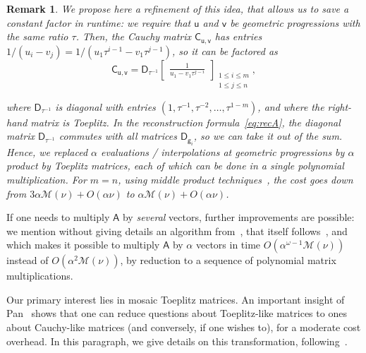 \documentclass[sigconf]{acmart}
\newcommand{\vg}{\ensuremath{\mathsf{g}}}
\newcommand{\vu}{\ensuremath{\mathsf{u}}}
\newcommand{\vv}{\ensuremath{\mathsf{v}}}
\newcommand{\mA}{\ensuremath{\mathsf{A}}}
\newcommand{\mC}{\ensuremath{\mathsf{C}}}
\newcommand{\mD}{\ensuremath{\mathsf{D}}}
\newcommand{\M}{\ensuremath{\mathscr{M}}}
\newcommand{\mx}{\ensuremath{\nu}}
\theoremstyle{acmdefinition}
\newtheorem{remark}[theorem]{Remark}
\begin{document}
\vspace{-2mm}

\begin{remark}\label{rmk:factor3}
We propose here a refinement of this idea, that allows us to
save a constant factor in runtime: we require that $\vu$ and $\vv$ be
geometric progressions with {\em the same ratio} $\tau$. Then, the
Cauchy matrix $\mC_{\vu,\vv}$ has entries $1/(u_i -
v_j) = 1/(u_1 \tau^{i-1} - v_1 \tau^{j-1})$, so it can be factored as
\vspace{-3px}
$$
\mC_{\vu,\vv}=\mD_{\tau^{-1}}
\begin{bmatrix}
\frac{1}{u_1 - v_1 \tau^{j-i}}
\end{bmatrix}_{\substack{1 \leq i \leq m\\1 \leq j \leq n}},
$$

\vspace{-3px}
\noindent where $\mD_{\tau^{-1}}$ is diagonal with entries
$(1,\tau^{-1},\tau^{-2},\dots,\tau^{1-m})$, and where the right-hand
matrix is Toeplitz. In the reconstruction formula~\eqref{eq:recA}, the
diagonal matrix $\mD_{\tau^{-1}}$ commutes with all matrices
$\mD_{\vg_i}$, so we can take it out of the sum. Hence, we replaced
$\alpha$ evaluations / interpolations at geometric progressions by
$\alpha$ product by Toeplitz matrices, each of which can be done in a
single polynomial multiplication.
%
%
For $m=n$, using middle product techniques~\cite{HaQuZi04,BoLeSc03},
the cost goes down from $3\alpha \M(\mx) +O(\alpha \mx)$ to
$\alpha \M(\mx) +O(\alpha \mx)$.
\end{remark}

If one needs to multiply $\mA$ by {\em several} vectors,
further improvements are possible: we mention without giving details
an algorithm from~\cite{BoJeMoSc16}, that itself
follows~\cite{BoJeSc08}, and which makes it possible to multiply $\mA$
by $\alpha$ vectors in time $O(\alpha^{\omega-1} \M(\mx))$ instead of
$O(\alpha^2 \M(\mx))$, by reduction to a sequence of polynomial matrix
multiplications.

\smallskip{}
Our primary interest lies in mosaic
Toep\-litz matrices. An important insight of Pan~\cite{Pan90} shows
that one can reduce questions about Toeplitz-like matrices to ones
about Cauchy-like matrices (and conversely, if one wishes to), for a
moderate cost overhead. In this paragraph, we give details on 
this transformation, following~\cite[Chapter~4.8]{Pan01}.
\end{document}
